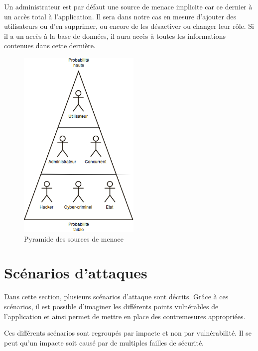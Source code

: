 \documentclass[12pt]{article}
\begin{document}
Un administrateur est par défaut une source de menace implicite car ce dernier à un accès total à l'application. Il sera dans notre cas en mesure d'ajouter des utilisateurs ou d'en supprimer, ou encore de les désactiver ou changer leur rôle. Si il a un accès à la base de données, il aura accès à toutes les informations contenues dans cette dernière.
\\


\begin{figure}[h]
 	\center
	\includegraphics[width=220px]{pyramid}
 	\caption{Pyramide des sources de menace} 
 	\label{flux}	
\end{figure}


\newpage
\section{Scénarios d'attaques}

Dans cette section, plusieurs scénarios d'attaque sont décrits. Grâce à ces scénarios, il est possible d'imaginer les différents points vulnérables de l'application et ainsi permet de mettre en place des contremesures appropriées.

Ces différents scénarios sont regroupés par impacte et non par vulnérabilité. Il se peut qu'un impacte soit causé par de multiples failles de sécurité.
\end{document}
